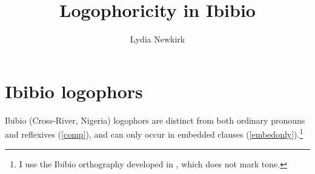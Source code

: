 \documentclass[output=paper]{langscibook}
\author{Lydia Newkirk\affiliation{Rutgers University}}
\title{Logophoricity in Ibibio}
\begin{document}
 
\title{\textsuperscript{}}




\section{Ibibio logophors}

Ibibio (Cross-River, Nigeria) logophors are distinct from both ordinary pronouns and reflexives (\ref{comp}), and can only occur in embedded clauses (\ref{embedonly}).\footnote{I use the Ibibio orthography developed in \citet{Essien1990}, which does not mark tone.}
\end{document}
